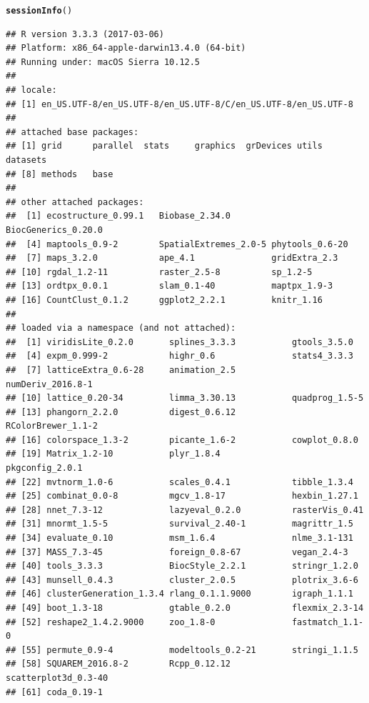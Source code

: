 \documentclass[12pt]{article}\usepackage[]{graphicx}\usepackage[usenames,dvipsnames]{color}
\makeatletter
\newcommand{\hlstd}[1]{\textcolor[rgb]{0.345,0.345,0.345}{#1}}%
\newcommand{\hlkwd}[1]{\textcolor[rgb]{0.737,0.353,0.396}{\textbf{#1}}}%
\newenvironment{kframe}{%
 \def\at@end@of@kframe{}%
 \ifinner\ifhmode%
  \def\at@end@of@kframe{\end{minipage}}%
  \begin{minipage}{\columnwidth}%
 \fi\fi%
 \def\FrameCommand##1{\hskip\@totalleftmargin \hskip-\fboxsep
 \colorbox{shadecolor}{##1}\hskip-\fboxsep
     \hskip-\linewidth \hskip-\@totalleftmargin \hskip\columnwidth}%
 \MakeFramed {\advance\hsize-\width
   \@totalleftmargin\z@ \linewidth\hsize
   \@setminipage}}%
 {\par\unskip\endMakeFramed%
 \at@end@of@kframe}
\newenvironment{knitrout}{}{} %
\makeatother
\begin{document}
\begin{knitrout}
\color{fgcolor}\begin{kframe}
\begin{alltt}
\hlkwd{sessionInfo}\hlstd{()}
\end{alltt}
\begin{verbatim}
## R version 3.3.3 (2017-03-06)
## Platform: x86_64-apple-darwin13.4.0 (64-bit)
## Running under: macOS Sierra 10.12.5
## 
## locale:
## [1] en_US.UTF-8/en_US.UTF-8/en_US.UTF-8/C/en_US.UTF-8/en_US.UTF-8
## 
## attached base packages:
## [1] grid      parallel  stats     graphics  grDevices utils     datasets 
## [8] methods   base     
## 
## other attached packages:
##  [1] ecostructure_0.99.1   Biobase_2.34.0        BiocGenerics_0.20.0  
##  [4] maptools_0.9-2        SpatialExtremes_2.0-5 phytools_0.6-20      
##  [7] maps_3.2.0            ape_4.1               gridExtra_2.3        
## [10] rgdal_1.2-11          raster_2.5-8          sp_1.2-5             
## [13] ordtpx_0.0.1          slam_0.1-40           maptpx_1.9-3         
## [16] CountClust_0.1.2      ggplot2_2.2.1         knitr_1.16           
## 
## loaded via a namespace (and not attached):
##  [1] viridisLite_0.2.0       splines_3.3.3           gtools_3.5.0           
##  [4] expm_0.999-2            highr_0.6               stats4_3.3.3           
##  [7] latticeExtra_0.6-28     animation_2.5           numDeriv_2016.8-1      
## [10] lattice_0.20-34         limma_3.30.13           quadprog_1.5-5         
## [13] phangorn_2.2.0          digest_0.6.12           RColorBrewer_1.1-2     
## [16] colorspace_1.3-2        picante_1.6-2           cowplot_0.8.0          
## [19] Matrix_1.2-10           plyr_1.8.4              pkgconfig_2.0.1        
## [22] mvtnorm_1.0-6           scales_0.4.1            tibble_1.3.4           
## [25] combinat_0.0-8          mgcv_1.8-17             hexbin_1.27.1          
## [28] nnet_7.3-12             lazyeval_0.2.0          rasterVis_0.41         
## [31] mnormt_1.5-5            survival_2.40-1         magrittr_1.5           
## [34] evaluate_0.10           msm_1.6.4               nlme_3.1-131           
## [37] MASS_7.3-45             foreign_0.8-67          vegan_2.4-3            
## [40] tools_3.3.3             BiocStyle_2.2.1         stringr_1.2.0          
## [43] munsell_0.4.3           cluster_2.0.5           plotrix_3.6-6          
## [46] clusterGeneration_1.3.4 rlang_0.1.1.9000        igraph_1.1.1           
## [49] boot_1.3-18             gtable_0.2.0            flexmix_2.3-14         
## [52] reshape2_1.4.2.9000     zoo_1.8-0               fastmatch_1.1-0        
## [55] permute_0.9-4           modeltools_0.2-21       stringi_1.1.5          
## [58] SQUAREM_2016.8-2        Rcpp_0.12.12            scatterplot3d_0.3-40   
## [61] coda_0.19-1
\end{verbatim}
\end{kframe}
\end{knitrout}
\end{document}
